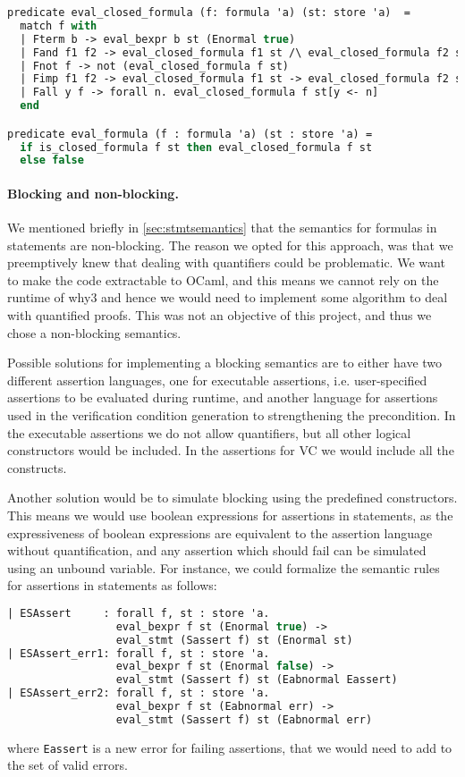 \begin{lstlisting}[caption={Predicate defining the semantics of formulas},label={lst:why3formula},language=sml]
predicate eval_closed_formula (f: formula 'a) (st: store 'a)  =
  match f with
  | Fterm b -> eval_bexpr b st (Enormal true)
  | Fand f1 f2 -> eval_closed_formula f1 st /\ eval_closed_formula f2 st
  | Fnot f -> not (eval_closed_formula f st)
  | Fimp f1 f2 -> eval_closed_formula f1 st -> eval_closed_formula f2 st
  | Fall y f -> forall n. eval_closed_formula f st[y <- n]
  end

predicate eval_formula (f : formula 'a) (st : store 'a) =
  if is_closed_formula f st then eval_closed_formula f st
  else false
\end{lstlisting}

\paragraph{Blocking and non-blocking.}
We mentioned briefly in \ref{sec:stmtsemantics} that the semantics for formulas in statements
are non-blocking.
The reason we opted for this approach, was that we preemptively knew that dealing with quantifiers could be problematic.
We want to make the code extractable to OCaml, and this means we cannot rely on the runtime of why3 and hence
we would need to implement some algorithm to deal with quantified proofs.
This was not an objective of this project, and thus we chose a non-blocking semantics.

Possible solutions for implementing a blocking semantics are to either have two different assertion languages,
one for executable assertions, i.e. user-specified assertions to be evaluated during runtime,
and another language for
assertions used in the verification condition generation to strengthening the precondition.
In the executable assertions we do not allow quantifiers, but all other logical constructors would be included.
In the assertions for VC we would include all the constructs.

Another solution would be to simulate blocking using the predefined constructors.
This means we would use boolean expressions for assertions in statements, as the expressiveness of boolean expressions are equivalent to the assertion language without quantification,
and any assertion which should fail can be simulated using an unbound variable.
For instance, we could formalize the semantic rules for assertions in statements as follows:

\begin{lstlisting}[language=sml]
| ESAssert     : forall f, st : store 'a.
                 eval_bexpr f st (Enormal true) ->
                 eval_stmt (Sassert f) st (Enormal st)
| ESAssert_err1: forall f, st : store 'a.
                 eval_bexpr f st (Enormal false) ->
                 eval_stmt (Sassert f) st (Eabnormal Eassert)
| ESAssert_err2: forall f, st : store 'a.
                 eval_bexpr f st (Eabnormal err) ->
                 eval_stmt (Sassert f) st (Eabnormal err)
\end{lstlisting}
where \texttt{Eassert} is a new error for failing assertions, that we would need to add to
the set of valid errors.

